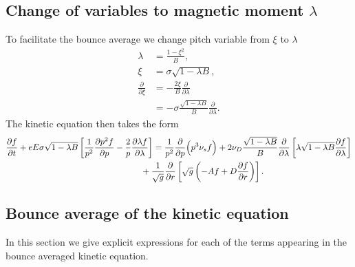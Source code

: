 \documentclass[11pt,a4paper]{article}
\begin{document}
\subsection{Change of variables to magnetic moment $\lambda$}
To facilitate the bounce average we change pitch variable from $\xi$ to $\lambda$
\begin{align}
\lambda &= \frac{1-\xi^2}{B}, \nonumber \\
\xi &= \sigma\sqrt{1-\lambda B}, \nonumber \\
\frac{\partial}{\partial \xi} &= -\frac{2\xi}{B}\frac{\partial}{\partial \lambda} \nonumber \\
&= -\sigma\frac{\sqrt{1-\lambda B}}{B}\frac{\partial}{\partial \lambda} .
\end{align}
The kinetic equation then takes the form
\begin{align}
\frac{\partial f}{\partial t} + eE \sigma\sqrt{1-\lambda B}\left[\frac{1}{p^2}\frac{\partial p^2 f}{\partial p}  - \frac{2}{p}\frac{\partial \lambda f}{\partial \lambda}\right] &= \frac{1}{p^2}\frac{\partial}{\partial p}\Big(p^3 \nu_s  f\Big) + 2\nu_D\frac{\sqrt{1-\lambda B}}{B}\frac{\partial}{\partial \lambda}\left[\lambda \sqrt{1-\lambda B}\frac{\partial f}{\partial \lambda}\right] \nonumber \\
&\hspace{-5mm} + \frac{1}{\sqrt{g}}\frac{\partial}{\partial r}\left[ \sqrt{g}\left( -Af+D\frac{\partial f}{\partial r}\right)\right].
\end{align}
 
\subsection{Bounce average of the kinetic equation}
In this section we give explicit expressions for each of the terms appearing in the bounce averaged kinetic equation.
\end{document}
